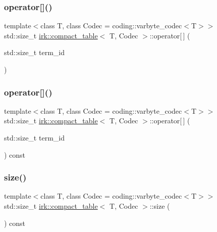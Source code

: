 \subsubsection{\texorpdfstring{operator[]()}{operator[]()}\hspace{0.1cm}{\footnotesize\ttfamily [1/2]}}
{\footnotesize\ttfamily template$<$class T, class Codec = coding\+::varbyte\+\_\+codec$<$\+T$>$$>$ \\
std\+::size\+\_\+t \mbox{\hyperlink{classirk_1_1compact__table}{irk\+::compact\+\_\+table}}$<$ T, Codec $>$\+::operator\mbox{[}$\,$\mbox{]} (\begin{DoxyParamCaption}\item[{std\+::size\+\_\+t}]{term\+\_\+id }\end{DoxyParamCaption})\hspace{0.3cm}{\ttfamily [inline]}}

\mbox{\label{classirk_1_1compact__table_ac80ecca694d256e4f3c5c29e98900ccc}} 
\subsubsection{\texorpdfstring{operator[]()}{operator[]()}\hspace{0.1cm}{\footnotesize\ttfamily [2/2]}}
{\footnotesize\ttfamily template$<$class T, class Codec = coding\+::varbyte\+\_\+codec$<$\+T$>$$>$ \\
std\+::size\+\_\+t \mbox{\hyperlink{classirk_1_1compact__table}{irk\+::compact\+\_\+table}}$<$ T, Codec $>$\+::operator\mbox{[}$\,$\mbox{]} (\begin{DoxyParamCaption}\item[{std\+::size\+\_\+t}]{term\+\_\+id }\end{DoxyParamCaption}) const\hspace{0.3cm}{\ttfamily [inline]}}

\mbox{\label{classirk_1_1compact__table_adb0104bee02709980c7a7f9cd3a7719e}} 
\subsubsection{\texorpdfstring{size()}{size()}}
{\footnotesize\ttfamily template$<$class T, class Codec = coding\+::varbyte\+\_\+codec$<$\+T$>$$>$ \\
std\+::size\+\_\+t \mbox{\hyperlink{classirk_1_1compact__table}{irk\+::compact\+\_\+table}}$<$ T, Codec $>$\+::size (\begin{DoxyParamCaption}{ }\end{DoxyParamCaption}) const\hspace{0.3cm}{\ttfamily [inline]}}



